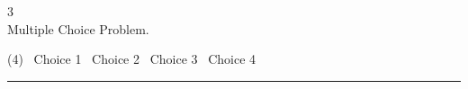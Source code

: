 \begin{question}[class=Z]{3}
  \MultipleChoiceInstructions \\[0.1in]

  Multiple Choice Problem.
  \begin{tasks}(4)
    \task[\choice] \ Choice 1
    \task[\correctchoice] \ Choice 2
    \task[\choice] \ Choice 3
    \task[\choice] \ Choice 4
  \end{tasks}
\end{question}

\noindent\rule{\textwidth}{1pt}
